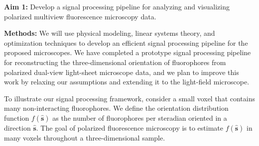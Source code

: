 \documentclass[11pt]{article}
\begin{document}
\noindent\textbf{Aim 1:} Develop a signal processing pipeline for analyzing and
  visualizing polarized multiview fluorescence microscopy data.

  \noindent\textbf{Methods:} We will use physical modeling, linear systems
  theory, and optimization techniques to develop an efficient signal processing
  pipeline for the proposed microscopes. We have completed a prototype signal
  processing pipeline for reconstructing the three-dimensional orientation of
  fluorophores from polarized dual-view light-sheet microscope data, and we plan
  to improve this work by relaxing our assumptions and extending it to the
  light-field microscope.

  To illustrate our signal processing framework, consider a small voxel that
  contains many non-interacting fluorophores. We define the orientation
  distribution function $f(\hat{\mathbf{s}})$ as the number of fluorophores per
  steradian oriented in a direction $\hat{\mathbf{s}}$. The goal of polarized
  fluorescence microscopy is to estimate $f(\hat{\mathbf{s}})$ in many voxels
  throughout a three-dimensional sample.
  
\end{document}
